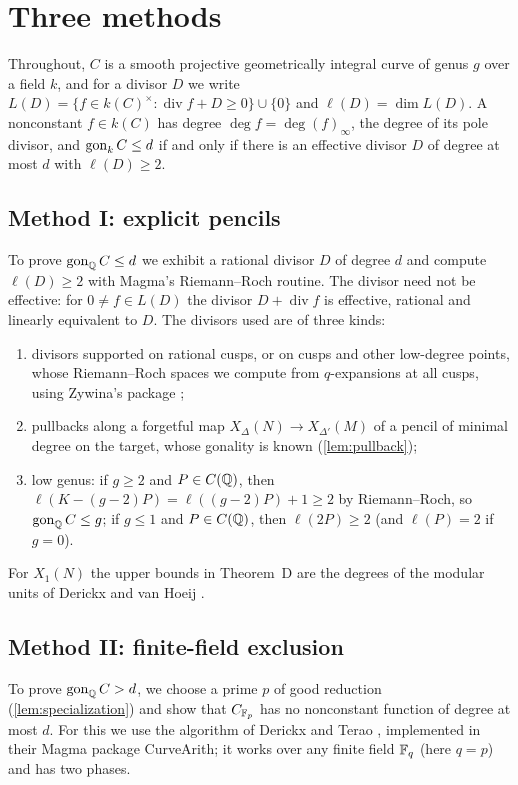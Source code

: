 \section{Three methods}\label{sec:methods}

Throughout, $C$ is a smooth projective geometrically integral curve of genus $g$ over a field $k$, and for a
divisor $D$ we write $L(D)=\{f\in k(C)^\times:\operatorname{div}f+D\ge0\}\cup\{0\}$ and $\ell(D)=\dim L(D)$.
A nonconstant $f\in k(C)$ has degree $\deg f=\deg(f)_\infty$, the degree of its pole divisor, and
$\operatorname{gon}_kC\le d$ if and only if there is an effective divisor $D$ of degree at most $d$ with $\ell(D)\ge2$.

\subsection{Method I: explicit pencils}\label{sec:method-I}
To prove $\operatorname{gon}_{\mathbb{Q}} C\le d$ we exhibit a rational divisor $D$ of degree $d$ and compute $\ell(D)\ge2$ with
Magma's Riemann--Roch routine. The divisor need not be effective: for $0\ne f\in L(D)$ the divisor
$D+\operatorname{div}f$ is effective, rational and linearly equivalent to $D$. The divisors used are of three kinds:
\begin{enumerate}
\item divisors supported on rational cusps, or on cusps and other low-degree points, whose
 Riemann--Roch spaces we compute from $q$-expansions at all cusps, using Zywina's package
 \cite{ZywinaModular};
\item pullbacks along a forgetful map $X_\Delta(N)\to X_{\Delta'}(M)$ of a pencil of minimal degree on the
 target, whose gonality is known (\cref{lem:pullback});
\item low genus: if $g\ge2$ and $P\in C(\mathbb{Q})$, then $\ell(K-(g-2)P)=\ell((g-2)P)+1\ge2$ by Riemann--Roch, so
 $\operatorname{gon}_{\mathbb{Q}} C\le g$; if $g\le1$ and $P\in C(\mathbb{Q})$, then $\ell(2P)\ge2$ (and $\ell(P)=2$ if $g=0$).
\end{enumerate}
For $X_1(N)$ the upper bounds in Theorem~D are the degrees of the modular units of Derickx and van
Hoeij \cite[Table~1]{DerickxVanHoeij2014}.

\subsection{Method II: finite-field exclusion}\label{sec:method-II}
To prove $\operatorname{gon}_{\mathbb{Q}} C>d$, we choose a prime $p$ of good reduction (\cref{lem:specialization}) and show that
$C_{\mathbb{F}_p}$ has no nonconstant function of degree at most $d$. For this we use the algorithm of Derickx and Terao
\cite{DerickxTerao}, implemented in their Magma package CurveArith; it works over any finite field $\mathbb{F}_q$ (here
$q=p$) and has two phases.

